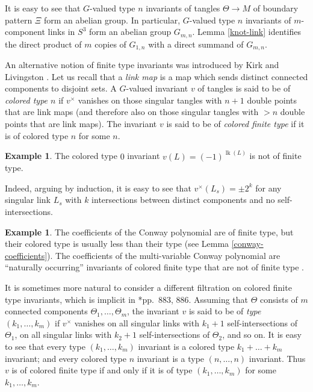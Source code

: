 \documentclass[a4paper,12pt,reqno,oneside]{amsart} %
\theoremstyle{plain}
\theoremstyle{definition}
\newtheorem{example}[theorem]{Example}
\theoremstyle{named}
\def\x{\times}
\renewcommand{\:}{\colon}
\DeclareMathOperator{\lk}{lk}
\begin{document}
It is easy to see that $G$-valued type $n$ invariants of tangles $\Theta\to M$ of boundary pattern $\Xi$ form an abelian group.
In particular, $G$-valued type $n$ invariants of $m$-component links in $S^3$ form an abelian group $G_{m,n}$.
Lemma \ref{knot-link} identifies the direct product of $m$ copies of $G_{1,n}$ with a direct summand of $G_{m,n}$.

An alternative notion of finite type invariants was introduced by Kirk and Livingston \cite{KL}.
Let us recall that a {\it link map} is a map which sends distinct connected components to disjoint sets.
A $G$-valued invariant $v$ of tangles is said to be of {\it colored type $n$} if $v^\x$ 
vanishes on those singular tangles with $n+1$ double points that are link maps (and therefore also on those singular 
tangles with $>n$ double points that are link maps).
The invariant $v$ is said to be of {\it colored finite type} if it is of colored type $n$ for some $n$.

\begin{example} The colored type $0$ invariant $v(L)=(-1)^{\lk(L)}$ is not of finite type.

Indeed, arguing by induction, it is easy to see that $v^\x(L_s)=\pm 2^k$ for any singular link $L_s$ with
$k$ intersections between distinct components and no self-intersections. 
\end{example}

\begin{example} The coefficients of the Conway polynomial are of finite type, but their colored type is usually less than their type 
(see Lemma \ref{conway-coefficients}).
The coefficients of the multi-variable Conway polynomial are ``naturally occurring'' invariants of colored finite type that are not 
of finite type \cite{M24-2}. 
\end{example}

It is sometimes more natural to consider a different filtration on colored finite type invariants, which is implicit in
\cite{ShYa}*{pp.\ 883, 886}.
Assuming that $\Theta$ consists of $m$ connected components $\Theta_1,\dots,\Theta_m$, the invariant $v$ is said to be 
of {\it type $(k_1,\dots,k_m)$} if $v^\x$ vanishes on all singular links with $k_1+1$ self-intersections of $\Theta_1$,
on all singular links with $k_2+1$ self-intersections of $\Theta_2$, and so on.
It is easy to see that every type $(k_1,\dots,k_m)$ invariant is a colored type $k_1+\dots+k_m$ invariant; 
and every colored type $n$ invariant is a type $(n,\dots,n)$ invariant.
Thus $v$ is of colored finite type if and only if it is of type $(k_1,\dots,k_m)$ for some $k_1,\dots,k_m$.
\end{document}
